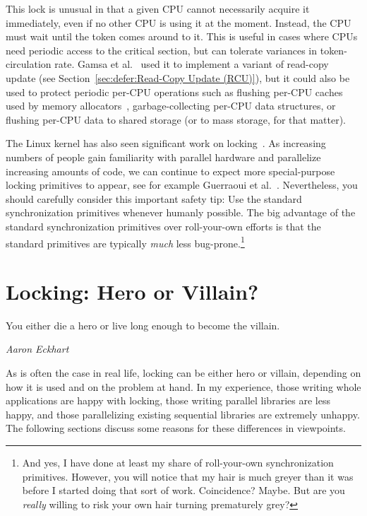 This lock is unusual in that a given CPU cannot necessarily acquire it
immediately, even if no other CPU is using it at the moment.
Instead, the CPU must wait until the token comes around to it.
This is useful in cases where CPUs need periodic access to the critical
section, but can tolerate variances in token-circulation rate.
Gamsa et al.~\cite{Gamsa99} used it to implement a variant of
read-copy update (see Section~\ref{sec:defer:Read-Copy Update (RCU)}),
but it could also be used to protect periodic per-CPU operations such
as flushing per-CPU caches used by memory allocators~\cite{McKenney93},
garbage-collecting per-CPU data structures, or flushing per-CPU
data to shared storage (or to mass storage, for that matter).

The Linux kernel has also seen significant work on
locking~\cite{JonathanCorbet2014qspinlocks,CatalinMarinas2018qspinlockTLA}.
As increasing numbers of people gain familiarity with parallel hardware
and parallelize increasing amounts of code, we can continue to expect more
special-purpose locking primitives to appear, see for example Guerraoui et
al.~\cite{Guerraoui:2019:LPA:3319851.3301501,HugoGuirouxPhD}.
Nevertheless, you should carefully consider this important safety tip:
Use the standard synchronization primitives whenever humanly possible.
The big advantage of the standard synchronization primitives over
roll-your-own efforts is that the standard primitives are typically
\emph{much} less bug-prone.\footnote{
	And yes, I have done at least my share of roll-your-own
	synchronization primitives.
	However, you will notice that my hair is much greyer than
	it was before I started doing that sort of work.
	Coincidence?
	Maybe.
	But are you \emph{really} willing to risk your own hair turning
	prematurely grey?}



\section{Locking: Hero or Villain?}
\label{sec:locking:Locking: Hero or Villain?}
%
\epigraph{You either die a hero or live long enough to become the villain.}
	 {\emph{Aaron Eckhart}}

As is often the case in real life, locking can be either hero or villain,
depending on how it is used and on the problem at hand.
In my experience, those writing whole applications are happy with
locking, those writing parallel libraries are less happy, and those
parallelizing existing sequential libraries are extremely unhappy.
The following sections discuss some reasons for these differences in
viewpoints.

